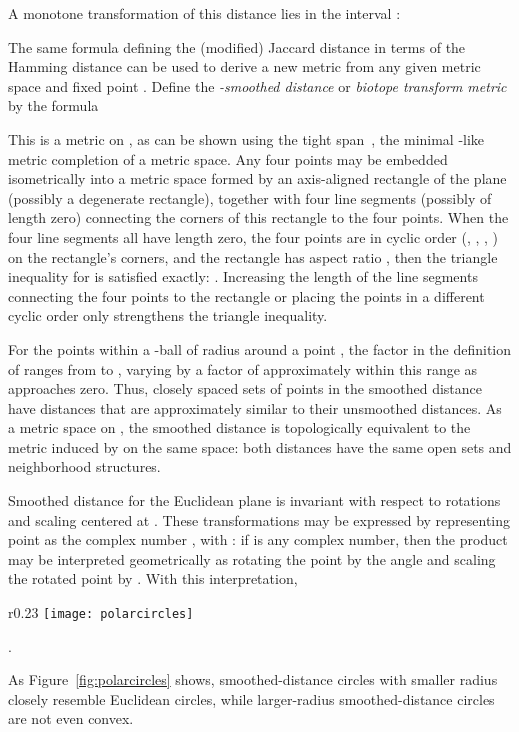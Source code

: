 \documentclass[10pt, conference, compsocconf]{IEEEtran}
\begin{document}
A monotone transformation of this distance lies in the interval :

The same formula defining the (modified) Jaccard distance in terms of the Hamming distance can be used to derive a new metric from any given metric space  and fixed point . Define the \emph{-smoothed distance} or \emph{biotope transform metric} by the formula


This is a metric on , as can be shown using the tight span~\cite{Isb-CMH-64,Dre-AiM-84}, the minimal -like metric completion of a metric space.
Any four points  may be embedded isometrically into a metric space formed by an axis-aligned rectangle of the  plane (possibly a degenerate rectangle), together with four line segments (possibly of length zero) connecting the corners of this rectangle to the four points. When the four line segments all have length zero, the four points are in cyclic order (, , , ) on the rectangle's corners, and the rectangle has aspect ratio , then the triangle inequality for  is satisfied exactly: . Increasing the length of the line segments connecting the four points to the rectangle or placing the points in a different cyclic order only strengthens the triangle inequality.

For the points within a -ball of radius  around a point , the factor  in the definition of  ranges from  to , varying by a factor of approximately  within this range as  approaches zero. Thus, closely spaced sets of points in the smoothed distance have distances that are approximately similar to their unsmoothed distances. As a metric space on , the smoothed distance  is  topologically equivalent to the metric induced by  on the same space: both distances have the same open sets and neighborhood structures.

Smoothed distance  for the Euclidean plane is invariant with respect to rotations and scaling centered at . These transformations may be expressed by representing point  as the complex number , with : if  is any complex number, then the product  may be interpreted geometrically as rotating the point  by the angle  and scaling the rotated point by . With this interpretation,
\begin{wrapfigure}{r}{0.23\textwidth}
\centering\texttt{[image: polarcircles]}
\caption{Concentric circles for smoothed distance in the Euclidean plane, with , , and radii 0.5, 0.6, 0.7, 0.8, and 0.9}
\label{fig:polarcircles}
\end{wrapfigure}
.

As Figure~\ref{fig:polarcircles}
shows, smoothed-distance circles with smaller radius closely resemble Euclidean circles, while larger-radius smoothed-distance circles are not even convex.
\end{document}
